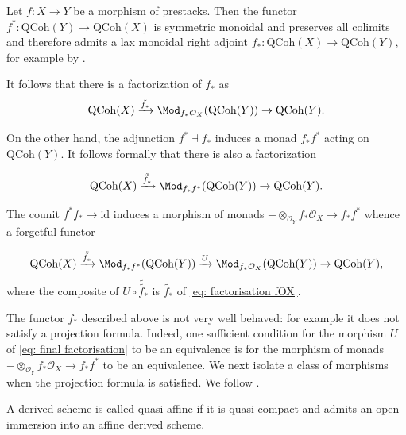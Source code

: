 \documentclass[10pt,reqno]{amsart}
\numberwithin{equation}{section}
\newcommand{\cO}{{\mathcal{O}}}
\newcommand{\Qcoh}{\mathrm{QCoh}}
\newcommand{\id}{\mathrm{id}}
\begin{document}
\begin{construction}\label{cons: lax monoidal right adjoint}
    Let $f\colon X\to Y$ be a morphism of prestacks. Then the functor $f^*\colon \Qcoh(Y)\to \Qcoh(X)$ is symmetric monoidal and preserves all colimits and therefore admits a lax monoidal right adjoint $f_*\colon \Qcoh(X)\to \Qcoh(Y)$, for example by \cite[Proposition 3.2.1]{Lurie2011DAGVIII}.

     It follows that there is a factorization of $f_*$ as 
    \begin{equation}\label{eq: factorisation fOX}
            \Qcoh(X)\xrightarrow{\tilde{f_*}}\Mod_{f_*\cO_X}(\Qcoh(Y))\to \Qcoh(Y).
\end{equation}
    

 On the other hand, the adjunction $f^*\dashv f_*$ induces a monad $f_*f^*$ acting on $\Qcoh(Y).$ It follows formally that there is also a factorization 

\begin{equation}\label{eq: factorisation ff*OX}
     \Qcoh(X)\xrightarrow{\tilde{\tilde{f_*}}}\Mod_{f_*f^*}(\Qcoh(Y))\to \Qcoh(Y).
\end{equation}

 The counit $f^*f_*\to \id$ induces a morphism of monads $-\otimes_{\cO_Y}f_*\cO_X\to f_*f^*$ whence a forgetful functor 

\begin{equation}\label{eq: final factorisation}
     \Qcoh(X)\xrightarrow{\tilde{\tilde{f_*}}}\Mod_{f_*f^*}(\Qcoh(Y))\xrightarrow{U} \Mod_{f_*\cO_X}(\Qcoh(Y))\to  \Qcoh(Y),
\end{equation}
 where the composite of $U\circ \tilde{\tilde{f_*}}$ is $\tilde{f_*}$ of \ref{eq: factorisation fOX}.

\end{construction}


\begin{remark}
The functor $f_*$ described above is not very well behaved: for example it does not satisfy a projection formula. 
Indeed, one sufficient condition for the morphism $U$ of \ref{eq: final factorisation} to be an equivalence is for the morphism of monads $-\otimes_{\cO_Y}f_*\cO_X\to f_*f^*$ to be an equivalence.
We next isolate a class of morphisms when the projection formula is satisfied. We follow \cite[\S~3]{GaitsgoryRozenblyum2017SAGI}.
\end{remark}

\begin{definition}\cite[\S~3.3]{GaitsgoryRozenblyum2017SAGI}\label{def: quasi-affine}
    A derived scheme is called quasi-affine if it is quasi-compact and admits an open immersion into an affine derived scheme.
\end{definition}
\end{document}
